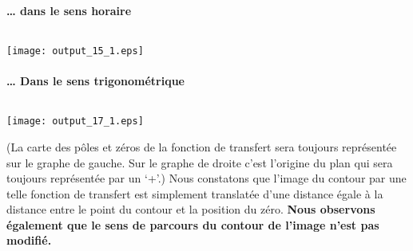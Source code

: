 \paragraph{\ldots{} dans le sens horaire\label{dans-le-sens-horaire}}
\begin{tcolorbox}[breakable, size=fbox, boxrule=1pt, 
    pad at break*=1mm,colback=cellbackground, colframe=cellborder]
\inputminted{python}{codes/python/annexe_cauchy_cellule7.py}
\end{tcolorbox}
\begin{center}
    \texttt{[image: output\_15\_1.eps]}
\end{center}
\paragraph{\ldots{} Dans le sens trigonométrique
           \label{dans-le-sens-trigonomuxe9trique}}
\begin{tcolorbox}[breakable, size=fbox, boxrule=1pt, 
    pad at break*=1mm,colback=cellbackground, colframe=cellborder]
\inputminted{python}{codes/python/annexe_cauchy_cellule8.py}
\end{tcolorbox}
\begin{center}
    \texttt{[image: output\_17\_1.eps]}
\end{center}
(La carte des pôles et zéros de la fonction de transfert sera toujours
représentée sur le graphe de gauche. Sur le graphe de droite c'est
l'origine du plan qui sera toujours représentée par un `+'.)
Nous constatons que l'image du contour par une telle fonction de
transfert est simplement translatée d'une distance égale à la distance
entre le point du contour et la position du zéro. \textbf{Nous observons
également que le sens de parcours du contour de l'image n'est pas
modifié.}
